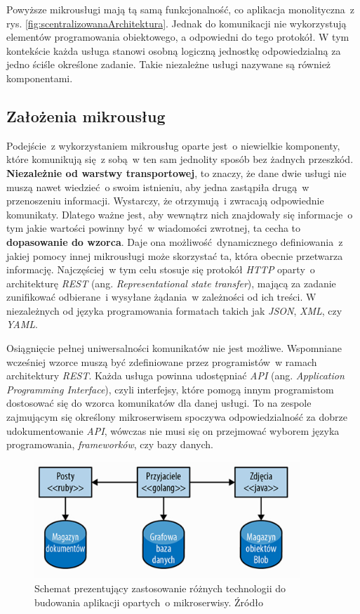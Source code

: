  Powyższe mikrousługi mają tą samą funkcjonalność, co aplikacja monolityczna~z rys. \ref{fig:scentralizowanaArchitektura}. Jednak do komunikacji nie wykorzystują elementów programowania obiektowego, a odpowiedni do tego protokół. W tym kontekście każda usługa stanowi osobną logiczną jednostkę odpowiedzialną za jedno ściśle określone zadanie\cite{Ziade:2018}. Takie niezależne usługi nazywane są również komponentami.
  
\subsection{Założenia mikrousług}
Podejście~z wykorzystaniem mikrousług oparte jest~o niewielkie komponenty, które komunikują się~z sobą~w ten sam jednolity sposób bez żadnych przeszkód\cite{Rodger:2019}. \textbf{Niezależnie od warstwy transportowej}, to znaczy, że dane dwie usługi nie muszą nawet wiedzieć~o swoim istnieniu, aby jedna zastąpiła drugą~w przenoszeniu informacji\cite{Rodger:2019}. Wystarczy, że otrzymują~i zwracają odpowiednie komunikaty. Dlatego ważne jest, aby wewnątrz nich znajdowały się informacje~o tym jakie wartości powinny być~w wiadomości zwrotnej, ta cecha to \textbf{dopasowanie do wzorca}. Daje ona możliwość dynamicznego definiowania~z jakiej pomocy innej mikrousługi może skorzystać ta, która obecnie przetwarza informację. Najczęściej~w tym celu stosuje się protokół \textit{HTTP}\cite{http} oparty~o architekturę \textit{REST} (ang. \textit{Representational state transfer}), mającą za zadanie zunifikować odbierane~i wysyłane żądania~w zależności od ich treści\cite{Rodger:2019}. W niezależnych od języka programowania formatach takich jak \textit{JSON}, \textit{XML}, czy \textit{YAML}\cite{Ziade:2018}.

Osiągnięcie pełnej uniwersalności komunikatów nie jest możliwe. Wspomniane wcześniej wzorce muszą być zdefiniowane przez programistów~w ramach architektury \textit{REST}. Każda usługa powinna udostępniać \textit{API} (ang. \textit{Application Programming Interface}), czyli interfejsy, które pomogą innym programistom dostosować się do wzorca komunikatów dla danej usługi\cite{Ziade:2018, Rodger:2019}. To na zespole zajmującym się określony mikroserwisem spoczywa odpowiedzialność za dobrze udokumentowanie \textit{API}, wówczas nie musi się on przejmować wyborem języka programowania, \textit{frameworków}, czy bazy danych\cite{Ziade:2018}.

\begin{figure}[h!]
	\centering
		\includegraphics[width=10cm]{Rysunki/Rozdzial1/rozneTechnologie.png}
		\caption{Schemat prezentujący zastosowanie różnych technologii do budowania aplikacji opartych~o mikroserwisy. Źródło \cite{Newman:2016}}	
		\label{fig:rozneTechnologie}
	\end{figure}
	


